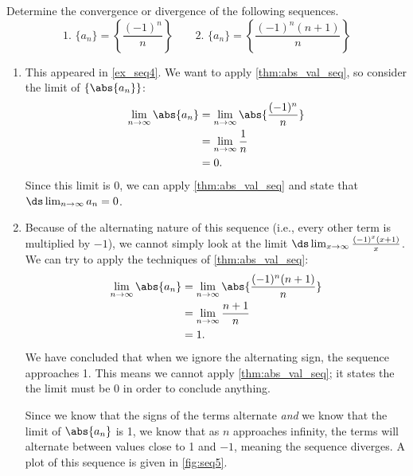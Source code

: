 \begin{example}\label{ex_seq5}
Determine the convergence or divergence of the following sequences.
\[
 \text{1. }\{a_n\} = \left\{\frac{(-1)^n}{n}\right\}\qquad
 \text{2. }\{a_n\} = \left\{\frac{(-1)^n(n+1)}{n}\right\}
\]
\solution
\begin{enumerate}
\item		This appeared in \autoref{ex_seq4}. We want to apply \autoref{thm:abs_val_seq}, so consider the limit of $\{\abs{a_n}\}$:
\begin{align*}
\lim_{n\to\infty}\abs{a_n}&= \lim_{n\to\infty} \abs{\frac{(-1)^n}{n}} \\
					&= \lim_{n\to\infty} \frac1n \\
					&= 0.
\end{align*}
Since this limit is 0, we can apply \autoref{thm:abs_val_seq} and state that $\ds\lim_{n\to\infty} a_n=0$.

\item Because of the alternating nature of this sequence (i.e., every other term is multiplied by $-1$), we cannot simply look at the limit $\ds \lim_{x\to\infty} \frac{(-1)^x(x+1)}{x}$. We can try to apply the techniques of \autoref{thm:abs_val_seq}:
\begin{align*}
	\lim_{n\to\infty}\abs{a_n}
	&= \lim_{n\to\infty} \abs{\frac{(-1)^n(n+1)}{n}} \\
	&= \lim_{n\to\infty} \frac{n+1}{n}\\
	&= 1.
\end{align*}
%
%
%
We have concluded that when we ignore the alternating sign, the se\-quence approaches 1. This means we cannot apply \autoref{thm:abs_val_seq}; it states the the limit must be 0 in order to conclude anything.

Since we know that the signs of the terms alternate \emph{and} we know that the limit of $\abs{a_n}$ is 1, we know that as $n$ approaches infinity, the terms will alternate between values close to 1 and $-1$, meaning the sequence diverges. A plot of this sequence is given in \autoref{fig:seq5}.
\end{enumerate}
\end{example}

